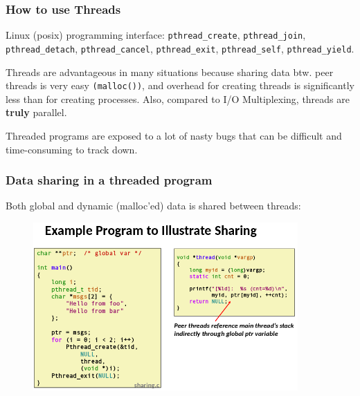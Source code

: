 \documentclass{beamer}
\begin{document}
%
%
%
\begin{frame}
\frametitle{How to use Threads}

Linux (posix) programming interface: \texttt{pthread\_create}, \texttt{pthread\_join},
\texttt{pthread\_detach}, \texttt{pthread\_cancel}, \texttt{pthread\_exit},
\texttt{pthread\_self}, \texttt{pthread\_yield}.\\\vspace{3mm}

Threads are advantageous in many situations because sharing data btw. peer threads
is very easy \texttt{(malloc())}, and overhead for creating threads is significantly
less than for creating processes. Also, compared to I/O Multiplexing, threads are
\textbf{truly} parallel.\\\vspace{3mm}

Threaded programs are exposed to a lot of nasty bugs that can be difficult and
time-consuming to track down.

\end{frame}



%
%
%
\begin{frame}
\frametitle{Data sharing in a threaded program}
Both global and dynamic (malloc'ed) data is shared between threads:

\begin{figure}
\includegraphics[width=0.9\textwidth]{images/example-program-to-illustrate-sharing.png}
\end{figure}
\end{frame}
\end{document}
